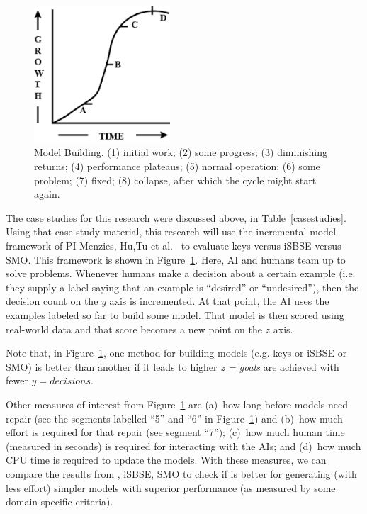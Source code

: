 \begin{figure}
 \includegraphics[width=2in]{fig/growth.png}
 \caption{Model Building. (1) initial work; (2) some progress; (3) diminishing returns; (4) performance plateaus; (5) normal operation; (6) some problem; (7)  fixed;  (8)   collapse, after which the  cycle might start again.  }\label{intoai}
\end{figure} The case studies for this research were discussed above, in 
Table~\ref{casestudies}.
Using that case study material,
 this research will
 use the  incremental model   framework of 
PI Menzies, Hu,Tu et al.~\cite{zhe19,tu20} to evaluate
keys versus iSBSE versus SMO.
This framework is shown in Figure~\ref{intoai}.  
Here,  AI and humans team up to solve problems. Whenever humans make a decision
about a certain example (i.e. they supply a label saying that an example  is ``desired'' or ``undesired''),
then the decision count on the  $y$ axis is incremented.
At that point, the AI uses the examples labeled so far to
build some model.
That model is then scored  using real-world data
and that  score becomes
a new point on the $z$ axis. 

Note that, in Figure~\ref{intoai},
 one method for building models (e.g. keys or iSBSE or SMO)
 is better than another if  it leads to
higher {\em z = goals} are achieved with fewer $y=decisions$.  

 Other measures of interest from Figure~\ref{intoai} 
are (a)~how long before  models   need
repair (see the segments labelled ``5'' and ``6'' in Figure~\ref{intoai}) and
(b)~how much effort is required for that repair (see   segment  ``7''); (c)~how much human time (measured in seconds)
is required for interacting with the AIs; and (d)~how much CPU
time is required to update the models.
With these measures, we can compare the results
from {\IT}, iSBSE, SMO to check
if {\IT} is better for generating  
(with less effort) simpler models with superior performance (as measured by some domain-specific criteria).


